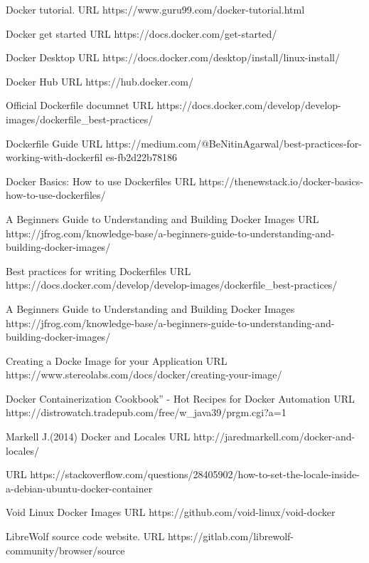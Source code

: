 \documentclass{article}  %
\begin{document}
\begin{thebibliography}{99}

Docker tutorial.
URL https://www.guru99.com/docker-tutorial.html

Docker get started
URL https://docs.docker.com/get-started/

Docker Desktop
URL https://docs.docker.com/desktop/install/linux-install/

Docker Hub
URL https://hub.docker.com/

Official Dockerfile documnet
URL https://docs.docker.com/develop/develop-images/dockerfile\_best-practices/


Dockerfile Guide
URL https://medium.com/@BeNitinAgarwal/best-practices-for-working-with-dockerfil
es-fb2d22b78186

Docker Basics: How to use Dockerfiles
URL https://thenewstack.io/docker-basics-how-to-use-dockerfiles/

A Beginners Guide to Understanding and Building Docker Images
URL https://jfrog.com/knowledge-base/a-beginners-guide-to-understanding-and-building-docker-images/

Best practices for writing Dockerfiles
URL https://docs.docker.com/develop/develop-images/dockerfile\_best-practices/

A Beginners Guide to Understanding and Building Docker Images
https://jfrog.com/knowledge-base/a-beginners-guide-to-understanding-and-
building-docker-images/

Creating a Docke Image for your Application
URL https://www.stereolabs.com/docs/docker/creating-your-image/

Docker Containerization Cookbook” - Hot Recipes for Docker Automation
URL https://distrowatch.tradepub.com/free/w\_java39/prgm.cgi?a=1

Markell J.(2014) Docker and Locales
URL http://jaredmarkell.com/docker-and-locales/


URL https://stackoverflow.com/questions/28405902/how-to-set-the-locale-inside-a-debian-ubuntu-docker-container

Void Linux Docker Images
URL https://github.com/void-linux/void-docker


LibreWolf source code website.
URL https://gitlab.com/librewolf-community/browser/source


\end{thebibliography}
\end{document}
